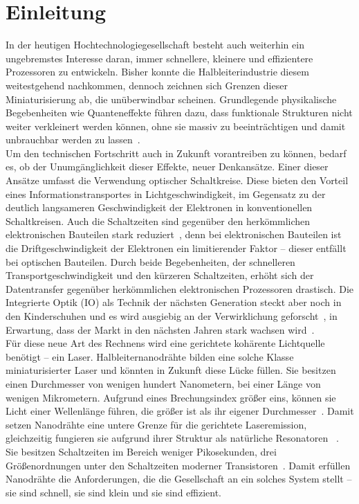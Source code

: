 \chapter{Einleitung} In der heutigen Hochtechnologiegesellschaft besteht auch
weiterhin ein \mbox{ungebremstes} Interesse daran, immer schnellere, kleinere
und effizientere Prozessoren zu \mbox{entwickeln}. Bisher konnte die
Halbleiterindustrie diesem weitestgehend nachkommen, dennoch zeichnen sich
Grenzen dieser Miniaturisierung ab, die unüberwindbar scheinen. Grundlegende
physikalische Begebenheiten wie Quanteneffekte führen dazu, dass funktionale
Strukturen nicht weiter verkleinert werden können, ohne sie massiv zu
beeinträchtigen und damit unbrauchbar werden zu lassen~\cite{Petrlic.2016}.\\  Um
den technischen Fortschritt auch in Zukunft vorantreiben zu können, bedarf es,
ob der Unumgänglichkeit dieser Effekte, neuer Denkansätze. Einer dieser Ansätze
umfasst die Verwendung optischer Schaltkreise. Diese bieten den Vorteil eines
Informationstransportes in Lichtgeschwindigkeit, im Gegensatz zu der deutlich
langsameren \mbox{Geschwindigkeit} der Elektronen in konventionellen
Schaltkreisen. Auch die Schaltzeiten sind gegenüber den herkömmlichen
elektronischen Bauteilen stark reduziert~\cite{Simonite.2010,Johnson.2015}, denn
bei elektronischen Bauteilen ist die Driftgeschwindigkeit der Elektronen ein
limitierender Faktor – dieser entfällt bei optischen Bauteilen. Durch beide
\mbox{Begebenheiten}, der schnelleren Transportgeschwindigkeit und den kürzeren
Schaltzeiten, \mbox{erhöht} sich der Datentransfer gegenüber herkömmlichen
elektronischen Prozessoren drastisch. Die Integrierte Optik (IO) als Technik der
nächsten Generation steckt aber noch in den Kinderschuhen und es wird ausgiebig
an der Verwirklichung geforscht~\cite{Touch.2017}, in Erwartung, dass der Markt
in den nächsten Jahren stark wachsen wird~\cite{Credence.2017}.\\ Für diese neue
Art des Rechnens wird eine gerichtete kohärente Lichtquelle benötigt – ein
Laser. Halbleiternanodrähte bilden eine solche Klasse miniaturisierter Laser und
könnten in Zukunft diese Lücke füllen. Sie besitzen einen Durchmesser von
wenigen hundert Nanometern, bei einer Länge von wenigen Mikrometern. Aufgrund
eines \mbox{Brechungsindex} größer eins, können sie Licht einer Wellenlänge
führen, die größer ist als ihr eigener Durchmesser~\cite{Zimmler.2010}. Damit
setzen Nanodrähte eine untere Grenze für die gerichtete Laseremission,
gleichzeitig fungieren sie aufgrund ihrer Struktur als natürliche Resonatoren
~\cite{Eichhorn.2013}. Sie besitzen Schaltzeiten im Bereich weniger
Pikosekunden, drei Größenordnungen unter den Schaltzeiten moderner
Transistoren~\cite{Sidiropoulos.2014,Qiu.2017}. Damit erfüllen Nanodrähte die
Anforderungen, die die Gesellschaft an ein solches System stellt – sie sind
schnell, sie sind klein und sie sind effizient.
